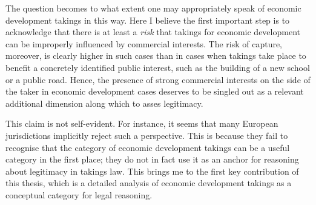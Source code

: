 The question becomes to what extent one may appropriately speak of economic development takings in this way. Here I believe the first important step is to acknowledge that there is at least a {\it risk} that takings for economic development can be improperly influenced by commercial interests. The risk of capture, moreover, is clearly higher in such cases than in cases when takings take place to benefit a concretely identified public interest, such as the building of a new school or a public road. Hence, the presence of strong commercial interests on the side of the taker in economic development cases deserves to be singled out as a relevant additional dimension along which to asses legitimacy.

This claim is not self-evident. For instance, it seems that many European jurisdictions implicitly reject such a perspective. This is because they fail to recognise that the category of economic development takings can be a useful category in the first place; they do not in fact use it as an anchor for reasoning about legitimacy in takings law. This brings me to the first key contribution of this thesis, which is a detailed analysis of economic development takings as a conceptual category for legal reasoning.

